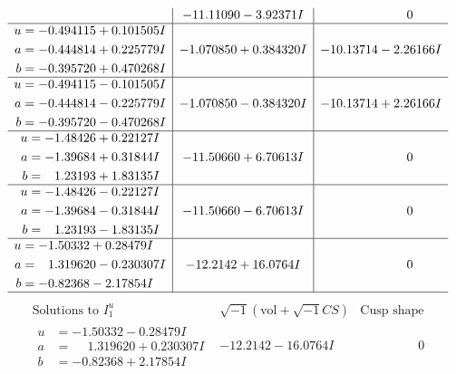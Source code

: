 \documentclass[1p]{elsarticle_modified}
\theoremstyle{definition}
\newcommand{\I}{\sqrt{-1}}
\begin{document}
$$\begin{array}{c|c|c}
 & -11.11090 - 3.92371 I & \phantom{-0.000000 } 0 \\ \hline\begin{aligned}
u &= -0.494115 + 0.101505 I \\
a &= -0.444814 + 0.225779 I \\
b &= -0.395720 + 0.470268 I\end{aligned}
 & -1.070850 + 0.384320 I & -10.13714 - 2.26166 I \\ \hline\begin{aligned}
u &= -0.494115 - 0.101505 I \\
a &= -0.444814 - 0.225779 I \\
b &= -0.395720 - 0.470268 I\end{aligned}
 & -1.070850 - 0.384320 I & -10.13714 + 2.26166 I \\ \hline\begin{aligned}
u &= -1.48426 + 0.22127 I \\
a &= -1.39684 + 0.31844 I \\
b &= \phantom{-}1.23193 + 1.83135 I\end{aligned}
 & -11.50660 + 6.70613 I & \phantom{-0.000000 } 0 \\ \hline\begin{aligned}
u &= -1.48426 - 0.22127 I \\
a &= -1.39684 - 0.31844 I \\
b &= \phantom{-}1.23193 - 1.83135 I\end{aligned}
 & -11.50660 - 6.70613 I & \phantom{-0.000000 } 0 \\ \hline\begin{aligned}
u &= -1.50332 + 0.28479 I \\
a &= \phantom{-}1.319620 - 0.230307 I \\
b &= -0.82368 - 2.17854 I\end{aligned}
 & -12.2142 + 16.0764 I & \phantom{-0.000000 } 0\\
 \hline 
 \end{array}$$\newpage$$\begin{array}{c|c|c}  
\text{Solutions to }I^u_{1}& \I (\text{vol} + \sqrt{-1}CS) & \text{Cusp shape}\\
 \hline 
\begin{aligned}
u &= -1.50332 - 0.28479 I \\
a &= \phantom{-}1.319620 + 0.230307 I \\
b &= -0.82368 + 2.17854 I\end{aligned}
 & -12.2142 - 16.0764 I & \phantom{-0.000000 } 0 \\ \hline\begin{aligned}

\end{aligned}
\end{array}$$
\end{document}
